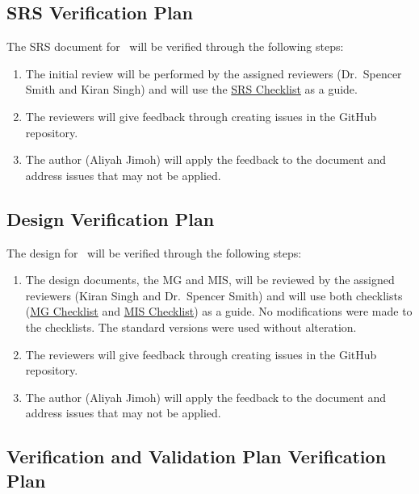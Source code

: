 \documentclass[12pt, titlepage]{article}
\begin{document}
\subsection{SRS Verification Plan}\label{plan_SRS}

The SRS document for \progname~will be verified through the following steps:
\begin{enumerate}
  \item The initial review will be performed by the assigned reviewers (Dr.~Spencer Smith and Kiran Singh) and will use the \href{https://github.com/AliyahJimoh/2D-Localizer/blob/main/docs/Checklists/SRS-Checklist.pdf}{SRS Checklist} as a guide.
  \item The reviewers will give feedback through creating issues in the GitHub repository.
  \item The author (Aliyah Jimoh) will apply the feedback to the document and address issues that may not be applied.
\end{enumerate}


\subsection{Design Verification Plan}\label{plan_design}
The design for \progname~will be verified through the following steps:
\begin{enumerate}
  \item The design documents, the MG and MIS, will be reviewed by the assigned reviewers (Kiran Singh and Dr.~Spencer Smith) and will use both checklists (\href{https://github.com/AliyahJimoh/2D-Localizer/blob/main/docs/Checklists/MG-Checklist.pdf}{MG Checklist} and \href{https://github.com/AliyahJimoh/2D-Localizer/blob/main/docs/Checklists/MIS-Checklist.pdf}{MIS Checklist}) as a guide. No modifications were made to the checklists. The standard versions were used without alteration.

  \item The reviewers will give feedback through creating issues in the GitHub repository.
  \item The author (Aliyah Jimoh) will apply the feedback to the document and address issues that may not be applied.
\end{enumerate}

\subsection{Verification and Validation Plan Verification Plan}\label{plan_verification}
\end{document}
